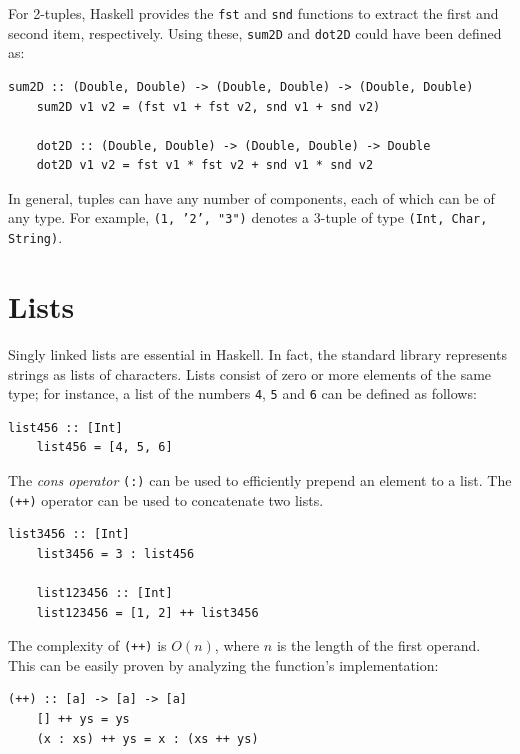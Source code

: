 \documentclass[UdineBachThesis,american,11pt]{PhdThesis}
\begin{document}
  For 2-tuples, Haskell provides the \mbox{\texttt{fst}} and \mbox{\texttt{snd}}
  functions to extract the first and second item, respectively. Using these,
  \mbox{\texttt{sum2D}} and \mbox{\texttt{dot2D}} could have been defined as:

  \begin{Verbatim}[gobble=4,fontsize=\small]
    sum2D :: (Double, Double) -> (Double, Double) -> (Double, Double)
    sum2D v1 v2 = (fst v1 + fst v2, snd v1 + snd v2)

    dot2D :: (Double, Double) -> (Double, Double) -> Double
    dot2D v1 v2 = fst v1 * fst v2 + snd v1 * snd v2
  \end{Verbatim}

  In general, tuples can have any number of components, each of which can be of
  any type. For example, \mbox{\texttt{(1, '2', "3")}} denotes a 3-tuple of type
  \mbox{\texttt{(Int, Char, String)}}.

  \section{Lists}

  Singly linked lists are essential in Haskell. In fact, the standard library
  represents strings as lists of characters. Lists consist of zero or more
  elements of the same type; for instance, a list of the numbers \texttt{4},
  \texttt{5} and \texttt{6} can be defined as follows:

  \begin{Verbatim}[gobble=4,fontsize=\small]
    list456 :: [Int]
    list456 = [4, 5, 6]
  \end{Verbatim}

  The \emph{cons operator} \mbox{\texttt{(:)}} can be used to efficiently
  prepend an element to a list. The \mbox{\texttt{(++)}} operator can be used to
  concatenate two lists.

  \begin{Verbatim}[gobble=4,fontsize=\small]
    list3456 :: [Int]
    list3456 = 3 : list456

    list123456 :: [Int]
    list123456 = [1, 2] ++ list3456
  \end{Verbatim}

  The complexity of \mbox{\texttt{(++)}} is
  \mbox{$O\mathopen{}\left(n\right)\mathclose{}$}, where $n$ is the length of
  the first operand. This can be easily proven by analyzing the function's
  implementation:

  \begin{Verbatim}[gobble=4,fontsize=\small]
    (++) :: [a] -> [a] -> [a]
    [] ++ ys = ys
    (x : xs) ++ ys = x : (xs ++ ys)
  \end{Verbatim}
\end{document}
